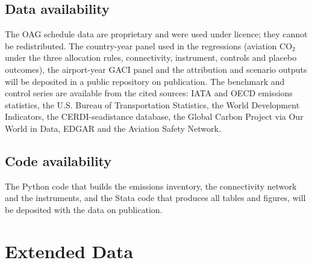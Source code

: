 \documentclass[12pt]{extarticle}
\begin{document}
\subsection*{Data availability}
The OAG schedule data are proprietary and were used under licence; they cannot be redistributed. The country-year panel used in the regressions (aviation CO$_2$ under the three allocation rules, connectivity, instrument, controls and placebo outcomes), the airport-year GACI panel and the attribution and scenario outputs will be deposited in a public repository on publication. The benchmark and control series are available from the cited sources: IATA and OECD emissions statistics, the U.S. Bureau of Transportation Statistics, the World Development Indicators, the CERDI-seadistance database, the Global Carbon Project via Our World in Data, EDGAR and the Aviation Safety Network.

\subsection*{Code availability}
The Python code that builds the emissions inventory, the connectivity network and the instruments, and the Stata code that produces all tables and figures, will be deposited with the data on publication.

\clearpage
\section*{Extended Data}
\setcounter{table}{0}\setcounter{figure}{0}
\renewcommand{\tablename}{Extended Data Table}
\renewcommand{\figurename}{Extended Data Fig.}
\end{document}
